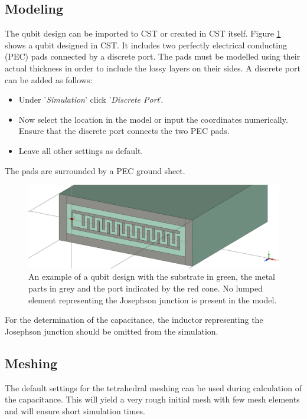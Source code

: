 \subsection{Modeling}
The qubit design can be imported to CST or created in CST itself. Figure \ref{fig:capacitance_basic_setup} shows a qubit designed in CST. It includes two perfectly electrical conducting (PEC) pads connected by a discrete port. The pads must be modelled using their actual thickness in order to include the lossy layers on their sides. A discrete port can be added as follows:
\begin{itemize}
	\item Under '\textit{Simulation}' click '\textit{Discrete Port}'.
	\item Now select the location in the model or input the coordinates numerically. Ensure that the discrete port connects the two PEC pads. 
	\item Leave all other settings as default.  
\end{itemize}
The pads are surrounded by a PEC ground sheet.
\begin{figure}
	\includegraphics[width=\textwidth]{Figures/capacitance_basic_setup}
	\caption{An example of a qubit design with the substrate in green, the metal parts in grey and the port indicated by the red cone. No lumped element representing the Josephson junction is present in the model.}
	\label{fig:capacitance_basic_setup}
\end{figure}
For the determination of the capacitance, the inductor representing the Josephson junction should be omitted from the simulation.
\subsection{Meshing}
The default settings for the tetrahedral meshing can be used during calculation of the capacitance. This will yield a very rough initial mesh with few mesh elements and will ensure short simulation times.
